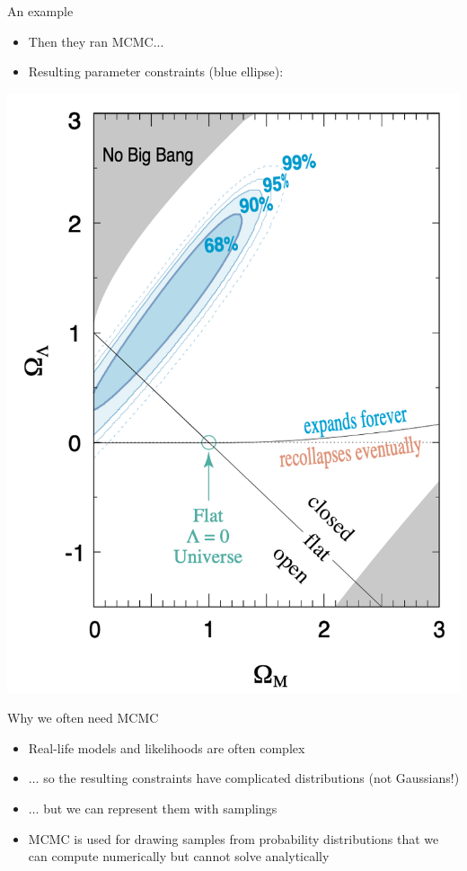 \documentclass{beamer}
\begin{document}
\begin{frame}{An example}
  \begin{itemize}
    \item Then they ran MCMC...
    \item Resulting parameter constraints (blue ellipse):
  \end{itemize}
  \includegraphics[height=0.6\textwidth]{pm-constraints}
\end{frame}

\begin{frame}{Why we often need MCMC}
  \begin{itemize}
  \item Real-life models and likelihoods are often complex
  \item $\ldots$ so the resulting \alert{constraints} have complicated distributions (not Gaussians!)
  \item $\ldots$ but we can represent them with \alert{samplings}
  \item MCMC is used for drawing samples from probability distributions
        that we can compute numerically but cannot solve analytically
  \end{itemize}
\end{frame}
\end{document}
